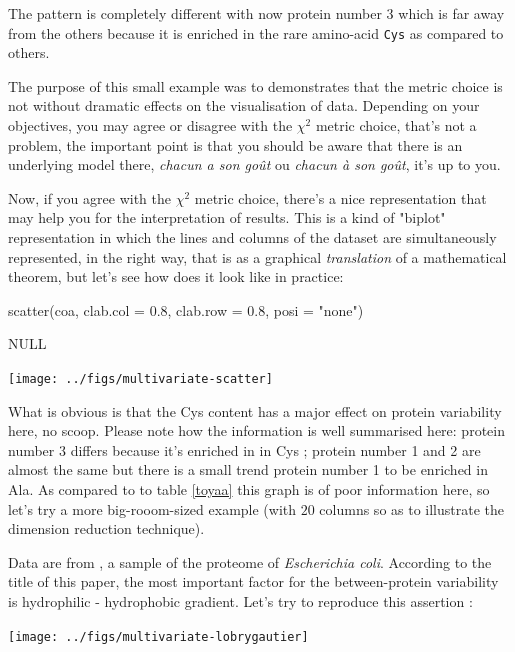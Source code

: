 \documentclass{article}
\begin{document}
The pattern is completely different with now protein number 3 which is far away from
the others because it is enriched in the rare amino-acid \texttt{Cys} as compared to
others.

The purpose of this small example was to demonstrates that the metric choice
is not without dramatic effects on the visualisation of data. Depending on your
objectives, you may agree or disagree with the $\chi^2$ metric choice, that's
not a problem, the important point is that you should be aware that there is
an underlying model there, \textit{chacun a son go{\^u}t} ou 
\textit{chacun {\`a} son go{\^u}t}, it's up to you.

Now, if you agree with the  $\chi^2$ metric choice, there's a nice
representation that may help you for the interpretation of results. 
This is a kind of "biplot" representation in which the lines and
columns of the dataset are simultaneously represented, in the
right way, that is as a graphical \textit{translation} of a 
mathematical theorem, but let's see how does it look like in practice: 

\begin{Schunk}
\begin{Sinput}
 scatter(coa, clab.col = 0.8, clab.row = 0.8, posi = "none")
\end{Sinput}
\begin{Soutput}
NULL
\end{Soutput}
\end{Schunk}
\texttt{[image: ../figs/multivariate-scatter]}

What is obvious is that the Cys content has a major effect on protein
variability here, no scoop. Please note how the information is well
summarised here: protein number 3 differs because it's enriched in
in Cys ; protein number 1 and 2 are almost the same but there is a
small trend protein number 1 to be enriched in Ala. As compared to
to table \ref{toyaa} this graph is of poor information here, so let's
try a more big-rooom-sized example (with $20$ columns so as to
illustrate the dimension reduction technique).

Data are from \cite{lobrygautier}, a sample of the proteome of
\textit{Escherichia coli}. According to the title of this paper,
the most important factor for the between-protein variability is
hydrophilic - hydrophobic gradient. Let's try to reproduce this
assertion :

\begin{Schunk}
\end{Schunk}
\texttt{[image: ../figs/multivariate-lobrygautier]}
\end{document}
